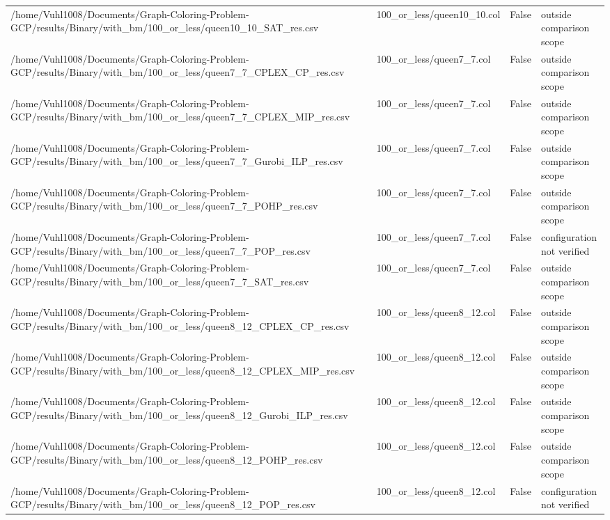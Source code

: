 \begin{table}[htbp]
\begin{tabular}{llll}
/home/Vuhl1008/Documents/Graph-Coloring-Problem-GCP/results/Binary/with\_bm/100\_or\_less/queen10\_10\_SAT\_res.csv & 100\_or\_less/queen10\_10.col & False & outside comparison scope \\
/home/Vuhl1008/Documents/Graph-Coloring-Problem-GCP/results/Binary/with\_bm/100\_or\_less/queen7\_7\_CPLEX\_CP\_res.csv & 100\_or\_less/queen7\_7.col & False & outside comparison scope \\
/home/Vuhl1008/Documents/Graph-Coloring-Problem-GCP/results/Binary/with\_bm/100\_or\_less/queen7\_7\_CPLEX\_MIP\_res.csv & 100\_or\_less/queen7\_7.col & False & outside comparison scope \\
/home/Vuhl1008/Documents/Graph-Coloring-Problem-GCP/results/Binary/with\_bm/100\_or\_less/queen7\_7\_Gurobi\_ILP\_res.csv & 100\_or\_less/queen7\_7.col & False & outside comparison scope \\
/home/Vuhl1008/Documents/Graph-Coloring-Problem-GCP/results/Binary/with\_bm/100\_or\_less/queen7\_7\_POHP\_res.csv & 100\_or\_less/queen7\_7.col & False & outside comparison scope \\
/home/Vuhl1008/Documents/Graph-Coloring-Problem-GCP/results/Binary/with\_bm/100\_or\_less/queen7\_7\_POP\_res.csv & 100\_or\_less/queen7\_7.col & False & configuration not verified \\
/home/Vuhl1008/Documents/Graph-Coloring-Problem-GCP/results/Binary/with\_bm/100\_or\_less/queen7\_7\_SAT\_res.csv & 100\_or\_less/queen7\_7.col & False & outside comparison scope \\
/home/Vuhl1008/Documents/Graph-Coloring-Problem-GCP/results/Binary/with\_bm/100\_or\_less/queen8\_12\_CPLEX\_CP\_res.csv & 100\_or\_less/queen8\_12.col & False & outside comparison scope \\
/home/Vuhl1008/Documents/Graph-Coloring-Problem-GCP/results/Binary/with\_bm/100\_or\_less/queen8\_12\_CPLEX\_MIP\_res.csv & 100\_or\_less/queen8\_12.col & False & outside comparison scope \\
/home/Vuhl1008/Documents/Graph-Coloring-Problem-GCP/results/Binary/with\_bm/100\_or\_less/queen8\_12\_Gurobi\_ILP\_res.csv & 100\_or\_less/queen8\_12.col & False & outside comparison scope \\
/home/Vuhl1008/Documents/Graph-Coloring-Problem-GCP/results/Binary/with\_bm/100\_or\_less/queen8\_12\_POHP\_res.csv & 100\_or\_less/queen8\_12.col & False & outside comparison scope \\
/home/Vuhl1008/Documents/Graph-Coloring-Problem-GCP/results/Binary/with\_bm/100\_or\_less/queen8\_12\_POP\_res.csv & 100\_or\_less/queen8\_12.col & False & configuration not verified \\

\end{tabular}
\end{table}

